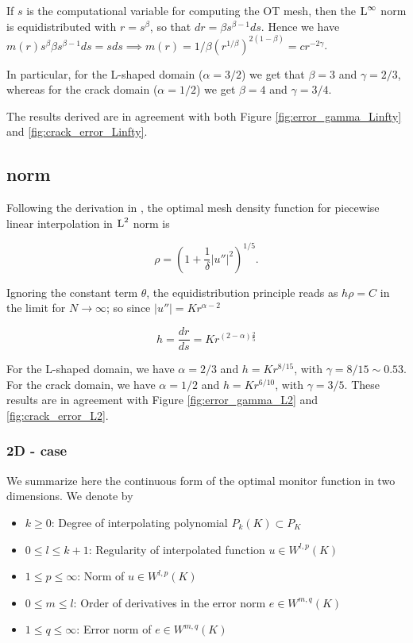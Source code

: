 \documentclass[a4paper,11pt]{article}
\begin{document}
{If $s$ is the computational variable for computing the OT mesh, then the $\operatorname L^{\infty}$ norm is equidistributed with $r = s^{\beta}$, so that $dr = \beta s^{\beta - 1} ds$. Hence we have $m(r) s^{\beta} \beta s^{\beta-1} ds = s ds \implies m(r) = 1/\beta (r^{1/\beta})^{2(1-\beta)} = c r^{-2\gamma}$.

In particular, for the L-shaped domain ($\alpha = 3/2$) we get that $\beta = 3$ and $\gamma = 2/3$, whereas for the crack domain ($\alpha = 1/2$) we get $\beta = 4$ and $\gamma = 3/4$.

The results derived are in agreement with both Figure \ref{fig:error_gamma_Linfty} and \ref{fig:crack_error_Linfty}.  

\subsection{ norm}

Following the derivation in \cite{HR:2011}, the optimal mesh density function for piecewise linear interpolation in $\operatorname L^{2}$ norm is

$$\rho = \left(1 + \frac{1}{\delta}|u''|^{2} \right)^{1/5}.$$

Ignoring the constant term $\theta$, the equidistribution principle reads as $h\rho = C$ in the limit for $N \rightarrow \infty$; so since $|u''| = Kr^{\alpha - 2}$

$$h = \frac{dr}{ds} = K r^{(2 -\alpha)\frac{2}{5}}$$

For the L-shaped domain, we have $\alpha = 2/3$ and $h = K r^{8/15}$, with $\gamma = 8/15 \sim 0.53$. For the crack domain, we have $\alpha = 1/2$ and  $h = K r^{6/10}$, with $\gamma = 3/5$. These results are in agreement with Figure \ref{fig:error_gamma_L2} and \ref{fig:crack_error_L2}. 


\subsubsection{2D - case}

We summarize here the continuous form of the optimal monitor function in two dimensions. We denote by

\begin{itemize}
\item $k\geq 0$: Degree of interpolating polynomial  $P_{k}(K) \subset P_{K}$ 
\item $0 \leq l \leq k+1$: Regularity of interpolated function $u \in W^{l,p}(K)$
\item $1 \leq p \leq \infty$: Norm of  $u \in W^{l,p}(K)$
\item $0 \leq m \leq l$: Order of derivatives in the error norm $e \in W^{m,q}(K)$ 
\item $1 \leq q \leq \infty $: Error norm of $e \in W^{m,q}(K)$
\end{itemize}

}
\end{document}
